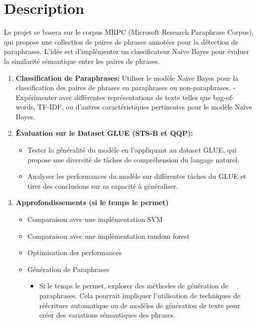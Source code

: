 \documentclass[12pt]{article}
\begin{document}
\pagebreak
\section{Description}
Le projet se basera sur le corpus MRPC
(Microsoft Research Paraphrase Corpus), qui propose une collection de
paires de phrases annotées pour la détection de paraphrases. L'idée est
d'implémenter un classificateur Naive Bayes pour évaluer la similarité
sémantique entre les paires de phrases.


\begin{enumerate}
	\item \textbf{Classification de Paraphrases:}
	      Utiliser le modèle Naive Bayes pour la classification des paires de phrases en paraphrases
	      ou non-paraphrases. - Expérimenter avec différentes représentations de
	      texte telles que bag-of-words, TF-IDF, ou d'autres caractéristiques
	      pertinentes pour le modèle Naive Bayes.
	\item \textbf{Évaluation sur le Dataset GLUE (STS-B et QQP):}
	      \begin{itemize}
		      \item Tester la généralité du modèle en l'appliquant au dataset GLUE, qui
		            propose une diversité de tâches de compréhension du langage naturel.
		      \item Analyser les performances du modèle sur différentes tâches du GLUE
		            et tirer des conclusions sur sa capacité à généraliser.
	      \end{itemize}
	\item \textbf{Approfondissements (si le temps le permet)}
	      \begin{itemize}
		      \item Comparaison avec une implémentation SVM
		      \item Comparaison avec une implémentation random forest
		      \item Optimisation des performances
		      \item Génération de Paraphrases
		            \begin{itemize}
			            \item Si le temps le permet, explorer des méthodes de génération de
			                  paraphrases. Cela pourrait impliquer l'utilisation de techniques de
			                  réécriture automatique ou de modèles de génération de texte pour
			                  créer des variations sémantiques des phrases.
		            \end{itemize}
	      \end{itemize}
\end{enumerate}
\end{document}
